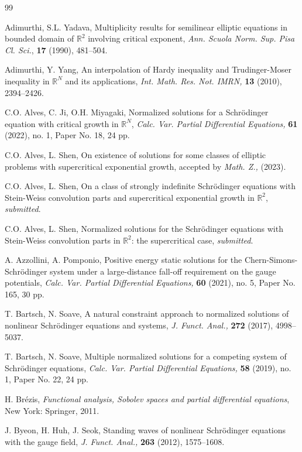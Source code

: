 \documentclass[11pt]{amsart}
\numberwithin{equation}{section}
\theoremstyle{definition}
\newcommand{\R}{\mathbb{R}}
\begin{document}
\begin{thebibliography}{99}

Adimurthi, S.L. Yadava, Multiplicity results for semilinear elliptic equations in bounded domain of $\mathbb{R}^{2}$
involving critical exponent, {\it Ann. Scuola Norm. Sup. Pisa Cl. Sci.}, \textbf{17} (1990), 481--504.

Adimurthi, Y. Yang, An interpolation of Hardy inequality and Trudinger-Moser inequality in $\R^N$
 and its
applications, {\it Int. Math. Res. Not. IMRN,} {\bf13} (2010), 2394--2426.

C.O. Alves, C. Ji, O.H. Miyagaki, Normalized solutions for a Schr\"{o}dinger equation with critical growth in $\R^N$,
 {\it Calc. Var. Partial Differential Equations,} {\bf61} (2022), no. 1, Paper No. 18, 24 pp.

C.O. Alves, L. Shen,
On existence of solutions  for some classes of elliptic problems with supercritical exponential growth,
accepted by {\it Math. Z.,} (2023).

C.O. Alves, L. Shen,
On a class of strongly indefinite Schr\"{o}dinger equations with Stein-Weiss convolution parts and supercritical
exponential growth in $\R^2$, {\it submitted}.

C.O. Alves, L. Shen, Normalized solutions for the Schr\"{o}dinger equations with Stein-Weiss convolution parts in $\R^2$: the supercritical case,
{\it submitted}.

A. Azzollini, A. Pomponio, Positive energy static solutions for the Chern-Simons-Schr\"{o}dinger system under a large-distance fall-off requirement
 on the gauge potentials, {\it Calc. Var. Partial Differential Equations,} {\bf60} (2021), no. 5, Paper No. 165, 30 pp.

T. Bartsch, N. Soave, A natural constraint approach to normalized solutions of nonlinear
Schr\"{o}dinger equations and systems, {\it J. Funct. Anal.,} {\bf272} (2017), 4998--5037.

T. Bartsch, N. Soave, Multiple normalized solutions for a competing system of Schr\"{o}dinger equations,
{\it Calc. Var. Partial Differential Equations,} {\bf58} (2019), no. 1, Paper No. 22, 24 pp.

 H. Br\'ezis, {\it Functional analysis, Sobolev spaces and partial differential equations}, New York: Springer, 2011.

J. Byeon, H. Huh, J. Seok, Standing waves of nonlinear Schr\"{o}dinger equations with the gauge field,
{\it J. Funct. Anal.,} {\bf263} (2012), 1575--1608.


\end{thebibliography}
\end{document}
